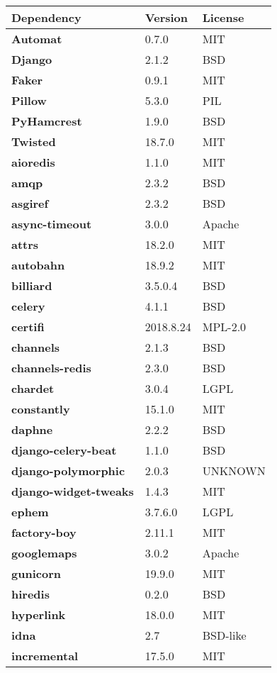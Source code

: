 \begin{longtable}{| p{} | p{} | p{} |}
\hline
\textbf{Dependency} & \textbf{Version} & \textbf{License} \\ \hline
\textbf{Automat} & 0.7.0 & MIT \\
\textbf{Django} & 2.1.2 & BSD \\
\textbf{Faker} & 0.9.1 & MIT \\
\textbf{Pillow} & 5.3.0 & PIL \\
\textbf{PyHamcrest} & 1.9.0 & BSD \\
\textbf{Twisted} & 18.7.0 & MIT \\
\textbf{aioredis} & 1.1.0 & MIT \\
\textbf{amqp} & 2.3.2 & BSD \\
\textbf{asgiref} & 2.3.2 & BSD \\
\textbf{async-timeout} & 3.0.0 & Apache \\
\textbf{attrs} & 18.2.0 & MIT \\
\textbf{autobahn} & 18.9.2 & MIT \\
\textbf{billiard} & 3.5.0.4 & BSD \\
\textbf{celery} & 4.1.1 & BSD \\
\textbf{certifi} & 2018.8.24 & MPL-2.0 \\
\textbf{channels} & 2.1.3 & BSD \\
\textbf{channels-redis} & 2.3.0 & BSD \\
\textbf{chardet} & 3.0.4 & LGPL \\
\textbf{constantly} & 15.1.0 & MIT \\
\textbf{daphne} & 2.2.2 & BSD \\
\textbf{django-celery-beat} & 1.1.0 & BSD \\
\textbf{django-polymorphic} & 2.0.3 & UNKNOWN \\
\textbf{django-widget-tweaks} & 1.4.3 & MIT \\
\textbf{ephem} & 3.7.6.0 & LGPL \\
\textbf{factory-boy} & 2.11.1 & MIT \\
\textbf{googlemaps} & 3.0.2 & Apache \\
\textbf{gunicorn} & 19.9.0 & MIT \\
\textbf{hiredis} & 0.2.0 & BSD \\
\textbf{hyperlink} & 18.0.0 & MIT \\
\textbf{idna} & 2.7 & BSD-like \\
\textbf{incremental} & 17.5.0 & MIT \\

\end{longtable}
